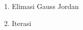 \documentclass{uofa-eng-assignment}
\begin{document}
\begin{enumerate}
\begin{enumerate}
              \item Elimasi Gauss Jordan \\
              \item Iterasi \\
          \end{enumerate}


\end{enumerate}
\end{document}
